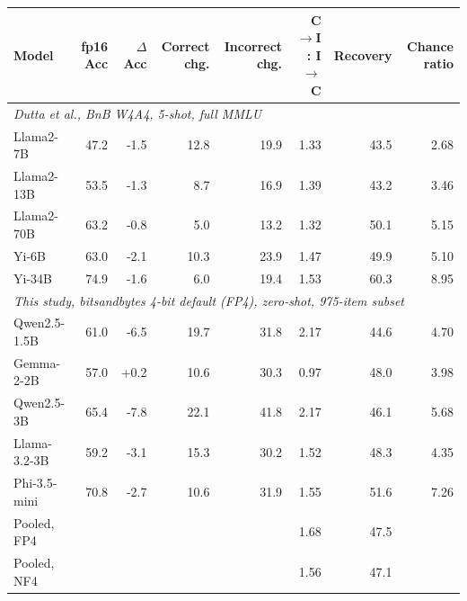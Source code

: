 \begin{tabular}{lrrrrrrr}
\toprule
Model & fp16 Acc & $\Delta$Acc & Correct chg. & Incorrect chg. & C$\to$I : I$\to$C & Recovery & Chance ratio \\
\midrule
\multicolumn{8}{l}{\emph{Dutta et al., BnB W4A4, 5-shot, full MMLU}} \\
Llama2-7B & 47.2 & -1.5 & 12.8 & 19.9 & 1.33 & 43.5 & 2.68 \\
Llama2-13B & 53.5 & -1.3 & 8.7 & 16.9 & 1.39 & 43.2 & 3.46 \\
Llama2-70B & 63.2 & -0.8 & 5.0 & 13.2 & 1.32 & 50.1 & 5.15 \\
Yi-6B & 63.0 & -2.1 & 10.3 & 23.9 & 1.47 & 49.9 & 5.10 \\
Yi-34B & 74.9 & -1.6 & 6.0 & 19.4 & 1.53 & 60.3 & 8.95 \\
\midrule
\multicolumn{8}{l}{\emph{This study, bitsandbytes 4-bit default (FP4), zero-shot, 975-item subset}} \\
Qwen2.5-1.5B & 61.0 & -6.5 & 19.7 & 31.8 & 2.17 & 44.6 & 4.70 \\
Gemma-2-2B & 57.0 & +0.2 & 10.6 & 30.3 & 0.97 & 48.0 & 3.98 \\
Qwen2.5-3B & 65.4 & -7.8 & 22.1 & 41.8 & 2.17 & 46.1 & 5.68 \\
Llama-3.2-3B & 59.2 & -3.1 & 15.3 & 30.2 & 1.52 & 48.3 & 4.35 \\
Phi-3.5-mini & 70.8 & -2.7 & 10.6 & 31.9 & 1.55 & 51.6 & 7.26 \\
Pooled, FP4 & & & & & 1.68 & 47.5 & \\
Pooled, NF4 & & & & & 1.56 & 47.1 & \\
\bottomrule
\end{tabular}